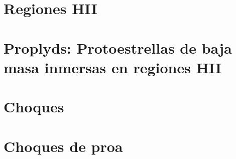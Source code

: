 \section{Regiones HII}

\section{Proplyds: Protoestrellas de baja masa inmersas en regiones HII}

\section{Choques}

\section{Choques de proa}